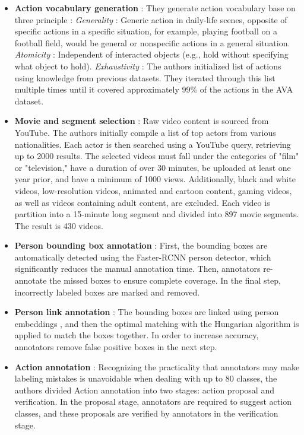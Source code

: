 \documentclass[10pt,onecolumn,letterpaper]{article}
\begin{document}
\begin{itemize}
	\item \textbf{Action vocabulary generation} : They generate action vocabulary
	base on three principle :  
	\subitem \textit{Generality} : Generic action in daily-life scenes, opposite of
	specific actions in a specific situation, for example, playing football on a
	football field, would be general or nonspecific actions in a general situation.
	\subitem \textit{Atomicity} : Independent of interacted objects (e.g., hold
	without specifying what object to hold).
	\subitem \textit{Exhaustivity} : The authors initialized list of actions using
	knowledge
	from previous datasets. They iterated through this list multiple times until it
	covered approximately 99\% of the actions in the AVA dataset.
	
	\item \textbf{Movie and segment selection} : Raw video content is sourced from YouTube. The authors initially compile a list of top actors from various nationalities. Each actor is then searched using a YouTube query, retrieving up to 2000 results. The selected videos must fall under the categories of "film" or "television," have a duration of over 30 minutes, be uploaded at least one year prior, and have a minimum of 1000 views. Additionally, black and white videos, low-resolution videos, animated and cartoon content, gaming videos, as well as videos containing adult content, are excluded. Each video is partition into a 15-minute long segment and divided into 897 movie segments. The result is 430 videos.
	
	\item \textbf{Person bounding box annotation} : First, the bounding boxes are automatically detected using the Faster-RCNN \cite{faster-rcnn} person detector, which significantly reduces the manual annotation time. Then, annotators re-annotate the missed boxes to ensure complete coverage. In the final step, incorrectly labeled boxes are marked and removed.
	
	\item \textbf{Person link annotation} : The bounding boxes are linked using person embeddings \cite{personembedding}, and then the optimal matching with the Hungarian algorithm \cite{TheHungarian} is applied to match the boxes together. In order to increase accuracy, annotators remove false positive boxes in the next step.
	
	\item \textbf{Action annotation} : Recognizing the practicality that annotators may make labeling mistakes is unavoidable when dealing with up to 80 classes, the authors divided Action annotation into two stages: action proposal and verification. In the proposal stage, annotators are required to suggest action classes, and these proposals are verified by annotators in the verification stage.
	
\end{itemize}
	
\end{document}
